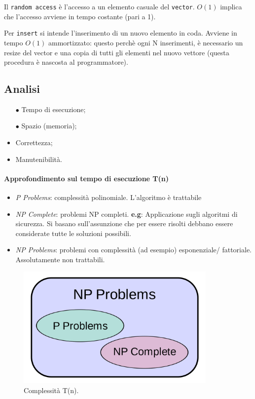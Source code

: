 Il \texttt{random access} è l'accesso a un elemento casuale del \texttt{vector}. 
$O(1)$ implica che l'accesso avviene in tempo costante (pari a 1). \par
Per \texttt{insert} si intende l'inserimento di un nuovo elemento in coda. 
Avviene in tempo $O(1)$ ammortizzato: questo perchè ogni N inserimenti, è 
necessario un resize del vector e una copia di tutti gli elementi nel nuovo vettore
(questa procedura è nascosta al programmatore).

\subsection{Analisi}

\begin{itemize}
	\item[$\bullet$] Tempo di esecuzione;
	\item[$\bullet$] Spazio (memoria);
	\medskip
	\item Correttezza;
	\item Manutenibilità.
\end{itemize}

\paragraph{Approfondimento sul tempo di esecuzione T(n)}

\begin{itemize}
	\item \textit{P Problems}: complessità polinomiale. L'algoritmo è trattabile
	\item \textit{NP Complete}: problemi NP completi. \textbf{e.g}: Applicazione sugli algoritmi di sicurezza. Si basano sull'assunzione che per essere risolti debbano essere considerate tutte le soluzioni possibili.
	\item \textit{NP Problems}: problemi con complessità  (ad esempio) esponenziale/ fattoriale. Assolutamente non trattabili.
\end{itemize}

\begin{figure}[htb]
	\centering
	\includegraphics[height=6cm]{img/algorithm-complexity.png}
	\caption{Complessità T(n).}	
\end{figure}

